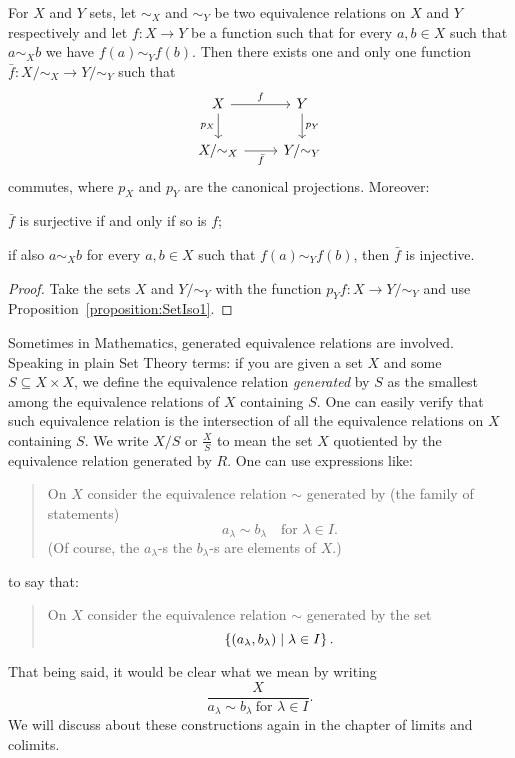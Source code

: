\begin{corollary}\label{cor:SetIso2}
For \(X\) and \(Y\) sets, let \(\sim_X\) and \(\sim_Y\) be two equivalence relations on \(X\) and \(Y\) respectively and let \(f : X \to Y\) be a function such that for every \(a, b \in X\) such that \(a \sim_X b\) we have \(f(a) \sim_Y f(b)\).
Then there exists one and only one function \(\bar f : X{/}{\sim_X} \to {Y}{/}{\sim_Y}\) such that
\[\begin{tikzcd}
X \ar["{p_X}", d, swap] \ar["f", r] & Y \ar["{p_Y}", d] \\
X{/}{\sim_X} \ar["{\bar f}", r, swap]   & {Y}{/}{\sim_Y}
\end{tikzcd}\]
commutes, where \(p_X\) and \(p_Y\) are the canonical projections. Moreover:
\begin{tcbenum}
\item \(\bar f\) is surjective if and only if so is \(f\);
\item if also \(a \sim_X b\) for every \(a, b \in X\) such that \(f(a) \sim_Y f(b)\),
then \(\bar f\) is injective.
\end{tcbenum}
\end{corollary}

\begin{proof}
Take the sets \(X\) and \({Y}{/}{\sim_Y}\) with the function \(p_Y f : X \to {Y}{/}{\sim_Y}\) and use Proposition~\ref{proposition:SetIso1}.
\end{proof}


Sometimes in Mathematics, generated equivalence relations are involved. Speaking in plain Set Theory terms: if you are given a set \(X\) and some \(S \subseteq X \times X\), we define the equivalence relation {\em generated} by \(S\) as the smallest among the equivalence relations of \(X\) containing \(S\). One can easily verify that such equivalence relation is the intersection of all the equivalence relations on \(X\) containing \(S\). We write \(X{/}{S}\) or \(\frac X S\) to mean the set \(X\) quotiented by the equivalence relation generated by \(R\). One can use expressions like:
\begin{quotation}
On \(X\) consider the equivalence relation \(\sim\) generated by (the family of statements)
\[a_\lambda \sim b_\lambda \quad \text{for } \lambda \in I .\]
(Of course, the \(a_\lambda\)-s the \(b_\lambda\)-s are elements of \(X\).)
\end{quotation}
to say that:
\begin{quotation}
On \(X\) consider the equivalence relation \(\sim\) generated by the set
\[\left\{(a_\lambda, b_\lambda) \mid \lambda \in I\right\} .\]
\end{quotation}
That being said, it would be clear what we mean by writing
\[\frac{X}{a_\lambda \sim b_\lambda \ \text{for } \lambda \in I} .\]
We will discuss about these constructions again in the chapter of limits and colimits.

